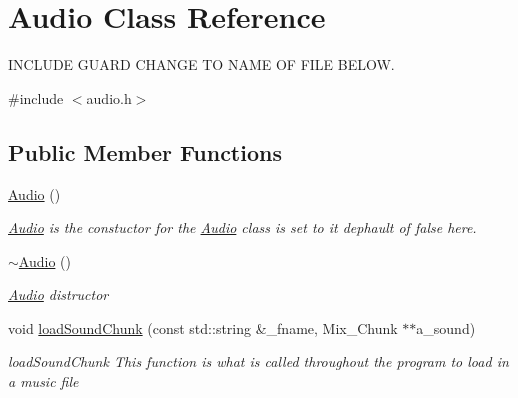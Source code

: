 \hypertarget{classAudio}{
\section{Audio Class Reference}
\label{classAudio}
}


INCLUDE GUARD CHANGE TO NAME OF FILE BELOW.  


{\ttfamily \#include $<$audio.h$>$}\subsection*{Public Member Functions}
\begin{DoxyCompactItemize}
\item 
\hypertarget{classAudio_aa9d3935a2b91ab4b825bc0cb05f245ea}{
\hyperlink{classAudio_aa9d3935a2b91ab4b825bc0cb05f245ea}{Audio} ()}
\label{classAudio_aa9d3935a2b91ab4b825bc0cb05f245ea}

\begin{DoxyCompactList}\small\item\em \hyperlink{classAudio}{Audio}  is the constuctor for the \hyperlink{classAudio}{Audio} class  is set to it dephault of false here. \item\end{DoxyCompactList}\item 
\hypertarget{classAudio_ae8f54deecb5f48511aaab469e80294d6}{
\hyperlink{classAudio_ae8f54deecb5f48511aaab469e80294d6}{$\sim$Audio} ()}
\label{classAudio_ae8f54deecb5f48511aaab469e80294d6}

\begin{DoxyCompactList}\small\item\em \hyperlink{classAudio}{Audio} distructor \item\end{DoxyCompactList}\item 
void \hyperlink{classAudio_a24c2a5a06eb70cf15028b71f78fe869d}{loadSoundChunk} (const std::string \&\_\-fname, Mix\_\-Chunk $\ast$$\ast$a\_\-sound)
\begin{DoxyCompactList}\small\item\em loadSoundChunk This function is what is called throughout the program to load in a music file \item\end{DoxyCompactList}\end{DoxyCompactItemize}
